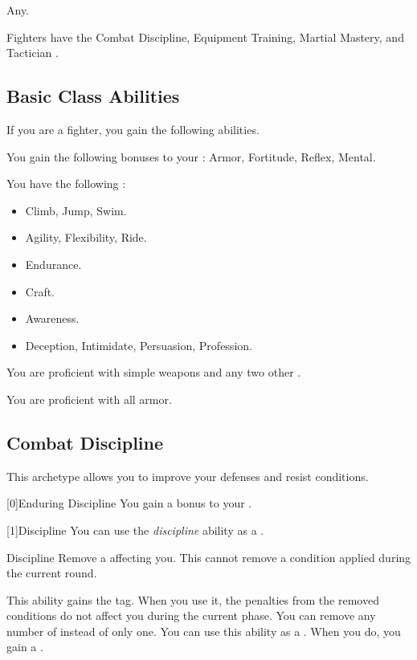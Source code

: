      Any.

     Fighters have the Combat Discipline, Equipment Training, Martial Mastery, and Tactician .

    \subsection{Basic Class Abilities}
        If you are a fighter, you gain the following abilities.

        You gain the following bonuses to your :  Armor,  Fortitude,  Reflex,  Mental.

        You have the following :
        \begin{itemize}
            \item {} Climb, Jump, Swim.
            \item {} Agility, Flexibility, Ride.
            \item {} Endurance.
            \item {} Craft.
            \item {} Awareness.
            \item {} Deception, Intimidate, Persuasion, Profession.
        \end{itemize}

        You are proficient with simple weapons and any two other .

        You are proficient with all armor.

    \newpage
    \subsection{Combat Discipline}
        This archetype allows you to improve your defenses and resist conditions.

        [0]{Enduring Discipline} You gain a  bonus to your .

        [1]{Discipline} You can use the \textit{discipline} ability as a .
        \begin{freeability}{Discipline}
            Remove a  affecting you.
            This cannot remove a condition applied during the current round.

            \rankline
             This ability gains the  tag.
            When you use it, the penalties from the removed conditions do not affect you during the current phase.
             You can remove any number of  instead of only one.
             You can use this ability as a .
            When you do, you gain a .
        \end{freeability}

